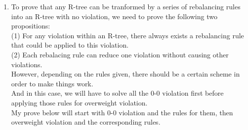 \documentclass[10pt]{article}
\begin{document}
\begin{enumerate}
\begin{proof}
\begin{addmargin}[1em]{0em}
        \textit{Rule 8:}
        \begin{addmargin}[1em]{0em}
			Let $S$ be the subtree whose root is $x$. \\
			$w$, $w'$ and be the weights of $x$ and $y$ respectively. \\
			$w \geq 1$ and $w' > 1$. \\
			Let $W$ be the weight of all path from $x$ to a leaf. \\
			By the condition of rule 8, $x$, $y$ and $z$ are all internal nodes. \\
			Since after the transformation, $x$, $y$ and $z$ are still internal nodes, and the transformation only interchanges the weight of $x$ and $z$, the properties of an R-tree regarding weight are maintained. \\
			Consider the new subtree $S'$. \\
			$z$ is the root of the new subtree with weight $w$. \\
			The weight of all path from the root to a leaf through the $z$'s child further from $y$ is $(W-w-0) + w = W$. \\
			The weight of all path from the root to a leaf through $x$ and $y$ is $(W-w-w') + w+0+w' = W$. \\
			The weight of all path from the root to a leaf through $x$ but not $y$ is $(W-w-0) + w+0 = W$, which is equall to the weight of all path from the root of $S$ to a leaf. \\
			Thus, by Lemma 2, the new tree is an R-tree.  
		\end{addmargin}

	\end{addmargin}
	
	\end{proof}

	\item
	To prove that any R-tree can be tranformed by a series of rebalancing rules into an R-tree with no violation, we need to prove the following two propositions: \\
	(1) For any violation within an R-tree, there always exists a rebalancing rule that could be applied to this violation. \\
	(2) Each rebalacing rule can reduce one violation without causing other violations. \\
	However, depending on the rules given, there should be a certain scheme in
	order to make things work. \\
	And in this case, we will have to solve all the 0-0 violation first before
	applying those rules for overweight violation. \\
	My prove below will start with 0-0 violation and the rules for them, then
	overweight violation and the corresponding rules. 


\end{enumerate}
\end{document}

